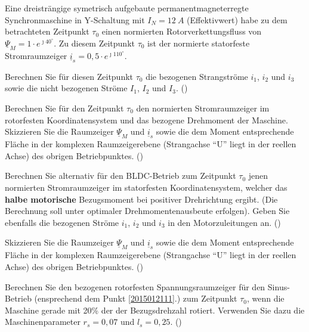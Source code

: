 \begin{question}[section=1,name={21.1.2015},mode=exm,type=bsp,tags={20150121}]
Eine dreisträngige symetrisch aufgebaute permanentmagneterregte Synchronmaschine in Y-Schaltung mit $I_N = 12~A$ (Effektivwert) habe zu dem betrachteten Zeitpunkt $\tau_0$ einen normierten Rotorverkettungsfluss von $\underline{\Psi}_M = 1 \cdot e^{\jmath 40 ^\circ}$. Zu diesem Zeitpunkt $\tau_0$ ist der normierte statorfeste Stromraumzeiger $\underline{i}_s = 0,5 \cdot e^{\jmath 110 ^\circ}$.
\begin{compactenum}
\item Berechnen Sie für diesen Zeitpunkt $\tau_0$ die bezogenen Strangströme $i_1$, $i_2$ und $i_3$ sowie die nicht bezogenen Ströme $I_1$, $I_2$ und $I_3$. ()\label{2015012111}
\item Berechnen Sie für den Zeitpunkt $\tau_0$ den normierten Stromraumzeiger im rotorfesten Koordinatensystem und das bezogene Drehmoment der Maschine. Skizzieren Sie die Raumzeiger $\underline{\Psi}_M$ und $\underline{i}_s$ sowie die dem Moment entsprechende Fläche in der komplexen Raumzeigerebene (Strangachse ``U'' liegt in der reellen Achse) des obrigen Betriebpunktes. ()
\item Berechnen Sie alternativ für den BLDC-Betrieb zum Zeitpunkt $\tau_0$ jenen normierten Stromraumzeiger im statorfesten Koordinatensystem, welcher das \textbf{halbe motorische} Bezugsmoment bei positiver Drehrichtung ergibt. (Die Berechnung soll unter optimaler Drehmomentenausbeute erfolgen). Geben Sie ebenfalls die bezogenen Ströme $i_1$, $i_2$ und $i_3$ in den Motorzuleitungen an. ()
\item Skizzieren Sie die Raumzeiger $\underline{\Psi}_M$ und $\underline{i}_s$ sowie die dem Moment entsprechende Fläche in der komplexen Raumzeigerebene (Strangachse ``U'' liegt in der reellen Achse) des obrigen Betriebpunktes. ()
\item Berechnen Sie den bezogenen rotorfesten Spannungsraumzeiger für den Sinus-Betrieb (ensprechend dem Punkt \ref{2015012111}.) zum Zeitpunkt $\tau_0$, wenn die Maschine gerade mit 20\% der der Bezugsdrehzahl rotiert. Verwenden Sie dazu die Maschinenparameter $r_s = 0,07$ und $l_s= 0,25$. ()
\end{compactenum}
\end{question}
